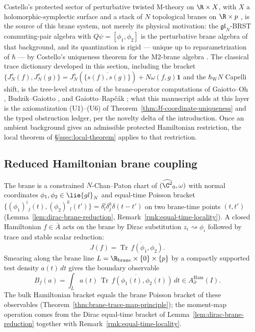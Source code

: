 \documentclass[11pt]{memoir}
\begin{document}
Costello's protected sector of perturbative twisted M-theory on
\(\R\times X\), with \(X\) a holomorphic-symplectic surface and a
stack of \(N\) topological branes on \(\R\times p\)
\cite{costello-twistedM}, is the source of this brane system, not
merely its physical motivation: the \(\mathfrak{gl}_N\)-BRST
commuting-pair algebra with \(Q\psi=[\phi_1,\phi_2]\) is the
perturbative brane algebra of that background, and its quantization
is rigid --- unique up to reparametrization of \(\hbar\) --- by
Costello's uniqueness theorem for the M2-brane algebra
\cite{costello-m2-koszul}.  The classical trace dictionary developed
  in this section, including the bracket
\(\{J_N^s(f),J_N^s(g)\}
=J_N^s(\overline{\{s(f),s(g)\}})+N\omega(f,g)\mathbf1\) and the \(\hbar_{\mathrm{W}}N\)
Capelli shift, is the tree-level stratum of the brane-operator
computations of Gaiotto--Oh \cite{gaiotto-oh-omega},
Budzik--Gaiotto \cite{budzik-gaiotto-twisted-holography}, and
Gaiotto--Rap\v{c}\'ak \cite{gaiotto-rapcak-miura}; what this
manuscript adds at this layer is the axiomatization
\textup{(U1)}--\textup{(U6)} of Theorem~\ref{thm:Jf-coordinate-uniqueness}
and the typed obstruction ledger, per the novelty delta of the
introduction.  Once an ambient background gives an
admissible protected Hamiltonian restriction, the local theorem of
\S\ref{ssec:local-theorem} applies to that restriction.

\subsection{Reduced Hamiltonian brane coupling}\label{ssec:reduced-brane-coupling}

The brane is a constrained $N$-Chan--Paton chart of
$(\widehat{\C^2}_0,\omega)$ with normal coordinates
$\phi_1,\phi_2\in\lie{gl}_N$ and equal-time Poisson bracket
$\{(\phi_1)^i{}_j(t),(\phi_2)^k{}_l(t')\}=\delta^i_l\delta^k_j\delta(t-t')$
on two brane-time points \((t,t')\) (Lemma~\ref{lem:dirac-brane-reduction},
Remark~\ref{rmk:equal-time-locality}).  A closed Hamiltonian $f\in\bar A$
acts on the brane by Dirac substitution
\(z_i\rightsquigarrow\phi_i\) followed by trace and stable scalar
reduction:
\[
  J(f)=\overline{\operatorname{Tr}\,f(\phi_1,\phi_2)}.
\]
Smearing along the brane line $L=\R_{\mathrm{brane}}\times\{0\}\times\{p\}$
by a compactly supported test density $a(t)\,dt$ gives the boundary
observable
\begin{equation}\label{eq:boundary-current-Bf}
  B_f(a)
    =\int_L a(t)\,
      \overline{\operatorname{Tr}\,f(\phi_1(t),\phi_2(t))}\,dt
    \in A_\partial^{\mathrm{Ham}}(I).
\end{equation}
The bulk Hamiltonian bracket equals the brane Poisson bracket of these
  observables (Theorem~\ref{thm:brane-trace-map-principle}); the
moment-map operation comes from the Dirac equal-time bracket of
Lemma~\ref{lem:dirac-brane-reduction} together with
Remark~\ref{rmk:equal-time-locality}.
\end{document}
